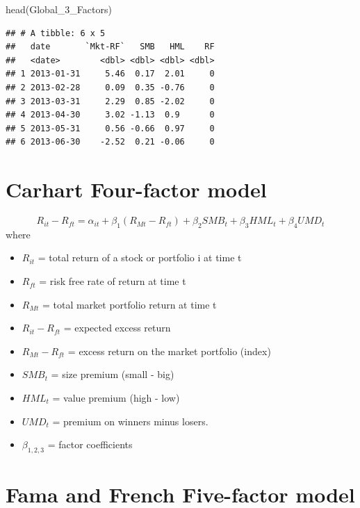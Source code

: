 \documentclass[
]{book}
\newenvironment{Shaded}{\begin{snugshade}}{\end{snugshade}}
\newcommand{\FunctionTok}[1]{\textcolor[rgb]{0.00,0.00,0.00}{#1}}
\newcommand{\NormalTok}[1]{#1}
\providecommand{\tightlist}{%
  \setlength{\itemsep}{0pt}\setlength{\parskip}{0pt}}
\begin{document}
\begin{Shaded}
\begin{Highlighting}[]
\FunctionTok{head}\NormalTok{(Global\_3\_Factors)}
\end{Highlighting}
\end{Shaded}

\begin{verbatim}
## # A tibble: 6 x 5
##   date       `Mkt-RF`   SMB   HML    RF
##   <date>        <dbl> <dbl> <dbl> <dbl>
## 1 2013-01-31     5.46  0.17  2.01     0
## 2 2013-02-28     0.09  0.35 -0.76     0
## 3 2013-03-31     2.29  0.85 -2.02     0
## 4 2013-04-30     3.02 -1.13  0.9      0
## 5 2013-05-31     0.56 -0.66  0.97     0
## 6 2013-06-30    -2.52  0.21 -0.06     0
\end{verbatim}

\hypertarget{carhart-four-factor-model}{%
\section{Carhart Four-factor model}\label{carhart-four-factor-model}}

\citep{Carhart_1997}

\[
R_{it} - R_{ft} = \alpha_{it} + \beta_1 (R_{Mt} - R_{ft}) + \beta_2 SMB_t + \beta_3 HML_t + \beta_4 UMD_t
\] where

\begin{itemize}
\tightlist
\item
  \(R_{it}\) = total return of a stock or portfolio i at time t
\item
  \(R_{ft}\) = risk free rate of return at time t
\item
  \(R_{Mt}\) = total market portfolio return at time t
\item
  \(R_{it} - R_{ft}\) = expected excess return
\item
  \(R_{Mt} - R_{ft}\) = excess return on the market portfolio (index)
\item
  \(SMB_t\) = size premium (small - big)
\item
  \(HML_t\) = value premium (high - low)
\item
  \(UMD_t\) = premium on winners minus losers.
\item
  \(\beta_{1,2,3}\) = factor coefficients
\end{itemize}

\hypertarget{fama-and-french-five-factor-model}{%
\section{Fama and French Five-factor model}\label{fama-and-french-five-factor-model}}
\end{document}
